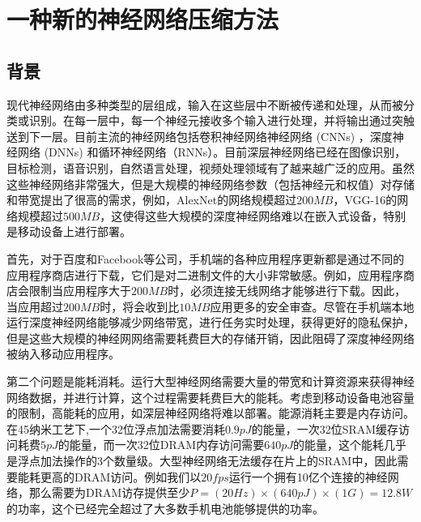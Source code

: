 \chapter{一种新的神经网络压缩方法}

\section{背景}
现代神经网络由多种类型的层组成，输入在这些层中不断被传递和处理，从而被分类或识别。在每一层中，每一个神经元接收多个输入进行处理，并将输出通过突触送到下一层。目前主流的神经网络包括卷积神经网络神经网络 (CNNs) ，深度神经网络 (DNNs) 和循环神经网络（RNNs）。目前深层神经网络已经在图像识别， 目标检测，语音识别，自然语言处理，视频处理领域有了越来越广泛的应用。虽然这些神经网络非常强大，但是大规模的神经网络参数（包括神经元和权值）对存储和带宽提出了很高的需求，例如，AlexNet的网络规模超过$200MB$，VGG-16的网络规模超过$500MB$，这使得这些大规模的深度神经网络难以在嵌入式设备，特别是移动设备上进行部署。

首先，对于百度和Facebook等公司，手机端的各种应用程序更新都是通过不同的应用程序商店进行下载，它们是对二进制文件的大小非常敏感。例如，应用程序商店会限制当应用程序大于$200MB$时，必须连接无线网络才能够进行下载。因此，当应用超过$200MB$时，将会收到比$10MB$应用更多的安全审查。尽管在手机端本地运行深度神经网络能够减少网络带宽，进行任务实时处理，获得更好的隐私保护，但是这些大规模的神经网网络需要耗费巨大的存储开销，因此阻碍了深度神经网络被纳入移动应用程序。

第二个问题是能耗消耗。运行大型神经网络需要大量的带宽和计算资源来获得神经网络数据，并进行计算，这个过程需要耗费巨大的能耗。考虑到移动设备电池容量的限制，高能耗的应用，如深层神经网络将难以部署。能源消耗主要是内存访问。在45纳米工艺下,一个32位浮点加法需要消耗$0.9pJ$的能量，一次32位SRAM缓存访问耗费$5pJ$的能量，而一次32位DRAM内存访问需要$640pJ$的能量，这个能耗几乎是浮点加法操作的3个数量级。大型神经网络无法缓存在片上的SRAM中，因此需要能耗更高的DRAM访问。例如我们以$20fps$运行一个拥有10亿个连接的神经网络，那么需要为DRAM访存提供至少$P = (20Hz)\times (640pJ)\times (1G) = 12.8W$的功率，这个已经完全超过了大多数手机电池能够提供的功率。


